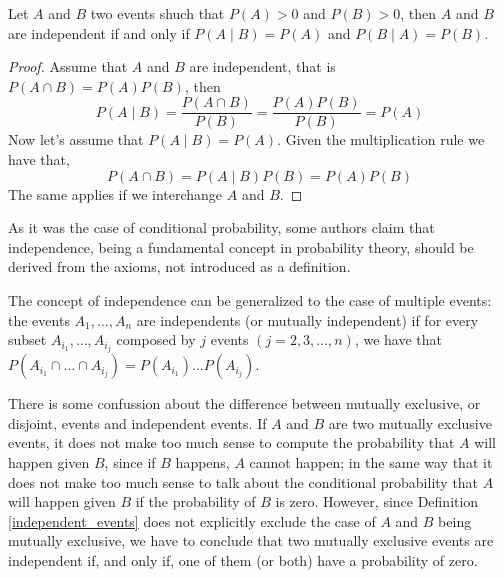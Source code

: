 \begin{proposition}
Let $A$ and $B$ two events shuch that $P \left( A \right) > 0$ and $P \left( B \right)>0$, then $A$ and $B$ are independent if and only if $P \left( A \mid B\right) = P \left( A \right)$ and $P \left( B \mid  A \right) = P \left( B \right)$.
\end{proposition}
\begin{proof}
Assume that $A$ and $B$ are independent, that is $P \left( A \cap B \right) = P \left( A \right) P \left(B \right)$, then
\[
P \left( A \mid B \right) = \frac{P\left(A\cap B\right)}{P\left(B\right)} = \frac{P \left( A \right) P \left(B \right)}{P\left(B\right)} = P \left( A \right)
\]
Now let's assume that $P \left( A \mid B \right) = P \left( A \right)$. Given the multiplication rule we have that,
\[
P \left( A \cap B \right) =  P \left( A \mid B \right) P \left( B \right) = P \left( A \right) P \left( B \right)
\] 
The same applies if we interchange $A$ and $B$. 
\end{proof}

As it was the case of conditional probability, some authors claim that independence, being a fundamental concept in probability theory, should be derived from the axioms, not introduced as a definition.

The concept of independence can be generalized to the case of multiple events: the events $A_{1}, \ldots, A_{n}$ are independents (or mutually independent) if for every subset $A_{i_1}, \ldots, A_{i_j}$ composed by $j$ events $\left( j = 2, 3, \ldots, n \right)$, we have that $P \left( A_{i_1} \cap \ldots \cap A_{i_j} \right) = P \left( A_{i_1} \right) \ldots P \left( A_{i_j}\right)$.

\begin{example}
There is some confussion about the difference between mutually exclusive, or disjoint, events and independent events. If $A$ and $B$ are two mutually exclusive events, it does not make too much sense to compute the probability that $A$ will happen given $B$, since if $B$ happens, $A$ cannot happen; in the same way that it does not make too much sense to talk about the conditional probability that $A$ will happen given $B$ if the probability of $B$ is zero. However, since Definition \ref{independent_events} does not explicitly exclude the case of $A$ and $B$ being mutually exclusive, we have to conclude that two mutually exclusive events are independent if, and only if, one of them (or both) have a probability of zero.
\end{example}

